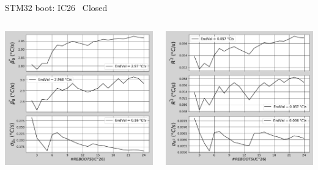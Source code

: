 \begin{frame}{STM32 boot: IC26 \textrightarrow\ Closed}
	\vspace{5mm}
	\begin{columns}
		\begin{column}{0.5\textwidth}
			\includegraphics[width=1.0\textwidth]{./figures/flistCircuit26_25_sl30beta0.pdf}
		\end{column}
		\begin{column}{0.5\textwidth}
			\includegraphics[width=1.0\textwidth]{./figures/flistCircuit26_25_sl30r2.pdf}
		\end{column}
	\end{columns}
\end{frame}
